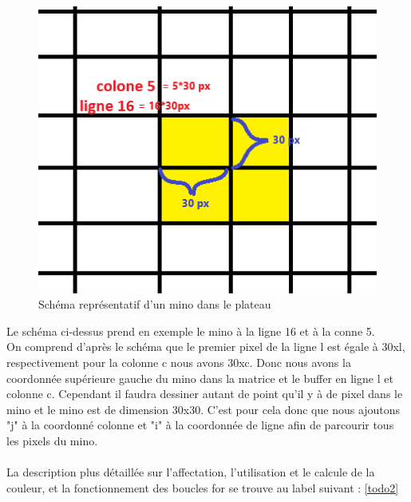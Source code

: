 \documentclass[a4paper,10p]{report}
\begin{document}
\begin{figure}[ht]
\includegraphics[scale=0.5]{ex_mino.png}
\caption{\label{dessin} Schéma représentatif d'un mino dans le plateau}
\end{figure}
\newpage
Le schéma ci-dessus prend en exemple le mino à la ligne 16 et à la conne 5.\\
On comprend d'après le schéma que le premier pixel de la ligne l est égale à 30xl, respectivement pour la colonne c nous avons 30xc. Donc nous avons la coordonnée supérieure gauche du mino dans la matrice et le buffer en ligne l et colonne c. Cependant il faudra dessiner autant de point qu'il y à de pixel dans le mino et le mino est de dimension 30x30. C'est pour cela donc que nous ajoutons "j" à la coordonné colonne et "i" à la coordonnée de ligne afin de parcourir tous les pixels du mino. 
\\\\La description plus détaillée sur l'affectation, l'utilisation et le calcule de la couleur, et la fonctionnement des boucles for se trouve au label suivant : \ref{todo2}
\end{document}
